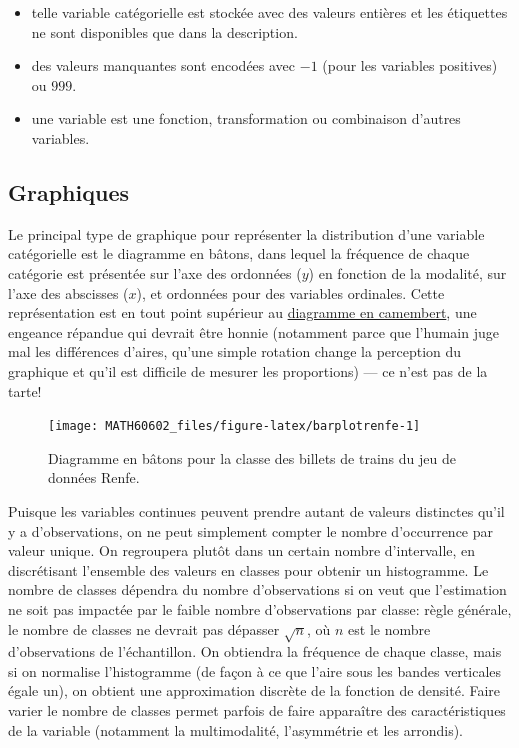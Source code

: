\documentclass[
  11pt,
  letterpaper,
]{book}
\providecommand{\tightlist}{%
  \setlength{\itemsep}{0pt}\setlength{\parskip}{0pt}}
\theoremstyle{definition}
\theoremstyle{definition}
\theoremstyle{definition}
\theoremstyle{definition}
\theoremstyle{remark}
\begin{document}
\begin{itemize}
\tightlist
\item
  telle variable catégorielle est stockée avec des valeurs entières et les étiquettes ne sont disponibles que dans la description.
\item
  des valeurs manquantes sont encodées avec \(-1\) (pour les variables positives) ou \(999\).
\item
  une variable est une fonction, transformation ou combinaison d'autres variables.
\end{itemize}

\hypertarget{graphiques}{%
\subsection{Graphiques}\label{graphiques}}

Le principal type de graphique pour représenter la distribution d'une variable catégorielle est le diagramme en bâtons, dans lequel la fréquence de chaque catégorie est présentée sur l'axe des ordonnées (\(y\)) en fonction de la modalité, sur l'axe des abscisses (\(x\)), et ordonnées pour des variables ordinales. Cette représentation est en tout point supérieur au \href{http://www.perceptualedge.com/articles/08-21-07.pdf}{diagramme en camembert}, une engeance répandue qui devrait être honnie (notamment parce que l'humain juge mal les différences d'aires, qu'une simple rotation change la perception du graphique et qu'il est difficile de mesurer les proportions) --- ce n'est pas de la tarte!

\begin{figure}

{\centering \texttt{[image: MATH60602\_files/figure-latex/barplotrenfe-1]} 

}

\caption{Diagramme en bâtons pour la classe des billets de trains du jeu de données Renfe.}\label{fig:barplotrenfe}
\end{figure}

Puisque les variables continues peuvent prendre autant de valeurs distinctes qu'il y a d'observations, on ne peut simplement compter le nombre d'occurrence par valeur unique. On regroupera plutôt dans un certain nombre d'intervalle, en discrétisant l'ensemble des valeurs en classes pour obtenir un histogramme. Le nombre de classes dépendra du nombre d'observations si on veut que l'estimation ne soit pas impactée par le faible nombre d'observations par classe: règle générale, le nombre de classes ne devrait pas dépasser \(\sqrt{n}\), où \(n\) est le nombre d'observations de l'échantillon. On obtiendra la fréquence de chaque classe, mais si on normalise l'histogramme (de façon à ce que l'aire sous les bandes verticales égale un), on obtient une approximation discrète de la fonction de densité. Faire varier le nombre de classes permet parfois de faire apparaître des caractéristiques de la variable (notamment la multimodalité, l'asymmétrie et les arrondis).
\end{document}
